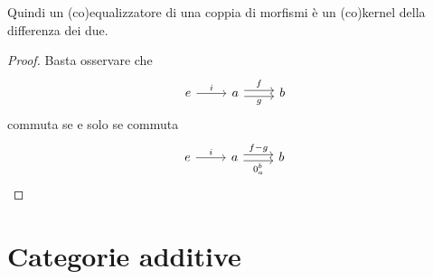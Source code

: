 Quindi un (co)equalizzatore di una coppia di morfismi è un (co)kernel della
differenza dei due. 

\begin{proof}
  Basta osservare che
  \[
    \begin{tikzcd}
      e \ar["i", r] & a \ar["f", r, shift left] \ar["g", r, shift right, swap] & b
    \end{tikzcd}
  \]
  commuta se e solo se commuta
  \[
    \begin{tikzcd}
      e \ar["i", r] & a \ar["{f-g}", r, shift left] \ar["{0_a^b}", r, shift right, swap] & b
    \end{tikzcd}
  \qedhere\]
\end{proof}



\section{Categorie additive}



